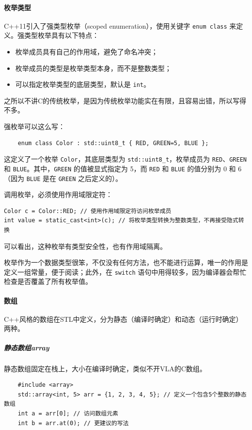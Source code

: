 \paragraph{枚举类型} C++11引入了强类型枚举（scoped enumeration），使用关键字 \verb|enum class| 来定义。强类型枚举具有以下特点：
\begin{itemize}
    \item 枚举成员具有自己的作用域，避免了命名冲突；
    \item 枚举成员的类型是枚举类型本身，而不是整数类型；
    \item 可以指定枚举类型的底层类型，默认是 \verb|int|。
\end{itemize}
之所以不讲C的传统枚举，是因为传统枚举功能实在有限，且容易出错，所以写得不多。

强枚举可以这么写：
\begin{verbatim}
    enum class Color : std::uint8_t { RED, GREEN=5, BLUE };
\end{verbatim}
这定义了一个枚举 \verb|Color|，其底层类型为 \verb|std::uint8_t|，枚举成员为 \verb|RED|、\verb|GREEN| 和 \verb|BLUE|。其中，\verb|GREEN| 的值被显式指定为 5，而 \verb|RED| 和 \verb|BLUE| 的值分别为 0 和 6（因为 \verb|BLUE| 是在 \verb|GREEN| 之后定义的）。

调用枚举，必须使用作用域限定符：
\begin{verbatim}
Color c = Color::RED; // 使用作用域限定符访问枚举成员
int value = static_cast<int>(c); // 将枚举类型转换为整数类型，不再接受隐式转换
\end{verbatim}

可以看出，这种枚举有类型安全性，也有作用域隔离。

枚举作为一个数据类型很笨，不仅没有任何方法，也不能进行运算，唯一的作用是定义一组常量，便于阅读；此外，在 \verb|switch| 语句中用得较多，因为编译器会帮忙检查是否覆盖了所有枚举值。

\paragraph{数组} C++风格的数组在STL中定义，分为静态（编译时确定）和动态（运行时确定）两种。

\subparagraph{静态数组array} 静态数组固定在栈上，大小在编译时确定，类似不开VLA的C数组。
\begin{verbatim}
    #include <array>
    std::array<int, 5> arr = {1, 2, 3, 4, 5}; // 定义一个包含5个整数的静态数组
    int a = arr[0]; // 访问数组元素
    int b = arr.at(0); // 更建议的写法
\end{verbatim}

